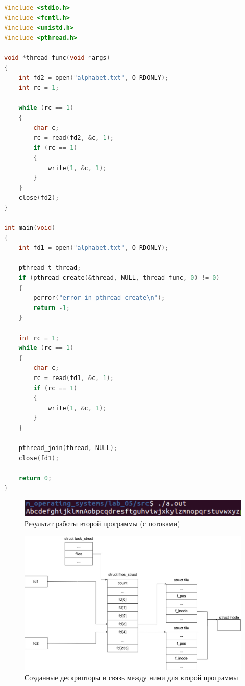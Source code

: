 \documentclass[12pt]{report}
\begin{document}
\begin{lstlisting}[language=c, label=p2thread, caption=Вторая программа (с потоками)]
#include <stdio.h>
#include <fcntl.h>
#include <unistd.h>
#include <pthread.h>

void *thread_func(void *args)
{
    int fd2 = open("alphabet.txt", O_RDONLY);
    int rc = 1;

    while (rc == 1)
    {
        char c;
        rc = read(fd2, &c, 1);
        if (rc == 1)
        {
            write(1, &c, 1);
        }
    }
    close(fd2);
}

int main(void)
{
    int fd1 = open("alphabet.txt", O_RDONLY);
    
    pthread_t thread;
    if (pthread_create(&thread, NULL, thread_func, 0) != 0)
	{
		perror("error in pthread_create\n");
		return -1;
	}

    int rc = 1;
    while (rc == 1)
    {
        char c;
        rc = read(fd1, &c, 1);
        if (rc == 1)
        {
            write(1, &c, 1);
        }
    }

    pthread_join(thread, NULL);
    close(fd1);

    return 0;
}

\end{lstlisting}



\begin{figure}[H]
	\centering
	\includegraphics[scale=1]{img/prog_02_thread.png}
	\caption{Результат работы второй программы (с потоками)}
	\label{fig:prog_02_thread}
\end{figure}


\begin{figure}[H]
	\centering
	\includegraphics[scale=0.4]{img/prog_02_schema.jpg}
	\caption{Созданные дескрипторы и связь между ними для второй программы}
	\label{fig:prog_02_schema}
\end{figure}
\end{document}
